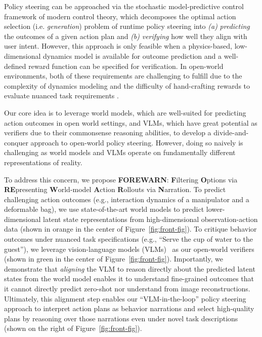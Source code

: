 Policy steering can be approached via the stochastic model-predictive control framework of modern control theory, which decomposes the optimal action selection (i.e. \textit{generation}) problem of runtime policy steering into \textit{(a)} \textit{predicting} the outcomes of a given action plan and \textit{(b)} \textit{verifying} how well they align with user intent. However, this approach is only feasible when a physics-based, low-dimensional dynamics model is available for outcome prediction and a well-defined reward function can be specified for verification. In open-world environments, both of these requirements are challenging to fulfill due to the complexity of dynamics modeling and the difficulty of hand-crafting rewards to evaluate nuanced task requirements \citep{hadfield2017inverse}.

Our core idea is to leverage world models, which are well-suited for predicting action outcomes in open world settings, and VLMs, which have great potential as verifiers due to their commonsense reasoning abilities, to develop a divide-and-conquer approach to open-world policy steering. However, doing so naively is challenging as world models and VLMs operate on fundamentally different representations of reality.


To address this concern, we propose  \textbf{FOREWARN}: \textbf{F}iltering \textbf{O}ptions via \textbf{RE}presenting \textbf{W}orld-model \textbf{A}ction \textbf{R}ollouts via \textbf{N}arration.
To predict challenging action outcomes (e.g., interaction dynamics of a manipulator and a deformable bag), we use state-of-the-art world models
\citep{liumulti,wu2023daydreamer} to predict lower-dimensional latent state representations from high-dimensional observation-action data (shown in orange in the center of Figure~\ref{fig:front-fig}). 
To critique behavior outcomes under nuanced task specifications (e.g., ``Serve the cup of water to the guest''), we leverage vision-language models (VLMs)~\cite{dubey2024llama,openai2024gpt4technicalreport} as our open-world verifiers (shown in green in the center of Figure~\ref{fig:front-fig}).
Importantly, we demonstrate that \textit{aligning} the VLM to reason directly about the predicted latent states from the world model enables it to understand fine-grained outcomes that it cannot directly predict zero-shot nor understand from image reconstructions. 
Ultimately, this alignment step enables our ``VLM-in-the-loop'' policy steering approach to interpret action plans as behavior narrations and select high-quality plans by reasoning over those narrations even under novel task descriptions
(shown on the right of Figure~\ref{fig:front-fig}). 



